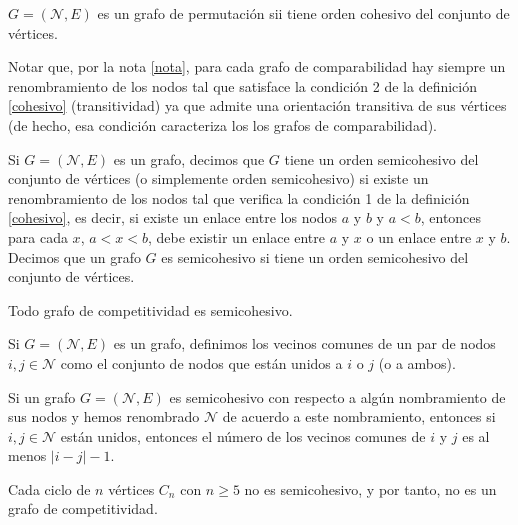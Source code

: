 \begin{teo}
$G = (\mathcal{N}, E)$ es un grafo de permutación sii tiene orden cohesivo del conjunto de vértices. 
\end{teo}

\begin{nota}
Notar que, por la nota \ref{nota}, para cada grafo de comparabilidad hay siempre un renombramiento de los nodos tal que satisface la condición 2 de la definición \ref{cohesivo} (transitividad) ya que admite una orientación transitiva de sus vértices (de hecho, esa condición caracteriza los los grafos de comparabilidad).
\end{nota}

\begin{defi}
Si $G=(\mathcal{N}, E)$ es un grafo, decimos que $G$ tiene un orden semicohesivo del conjunto de vértices (o simplemente orden semicohesivo) si existe un renombramiento de los nodos tal que verifica la condición 1 de la definición \ref{cohesivo}, es decir, si existe un enlace entre los nodos $a$ y $b$ y $a < b$, entonces para cada $x$, $a < x < b$, debe existir un enlace entre $a$ y $x$ o un enlace entre $x$ y $b$. Decimos que un grafo $G$ es semicohesivo si tiene un orden semicohesivo del conjunto de vértices. 
\end{defi}

\begin{lema}
Todo grafo de competitividad es semicohesivo.
\end{lema}

\begin{defi}
Si $G=(\mathcal{N},E)$ es un grafo, definimos los vecinos comunes de un par de nodos $i,j \in \mathcal{N}$ como el conjunto de nodos que están unidos a $i$ o $j$ (o a ambos).
\end{defi}

\begin{lema}
Si un grafo $G=(\mathcal{N},E)$ es semicohesivo con respecto a algún nombramiento de sus nodos y hemos renombrado $\mathcal{N}$ de acuerdo a este nombramiento, entonces si $i,j \in \mathcal{N}$ están unidos, entonces el número de los vecinos comunes de $i$ y $j$ es al menos $|i-j|-1$.
\end{lema}

\begin{lema}
Cada ciclo de $n$ vértices $C_n$ con $n \geq 5$ no es semicohesivo, y por tanto, no es un grafo de competitividad.
\end{lema}

\begin{lema}

\end{lema}

